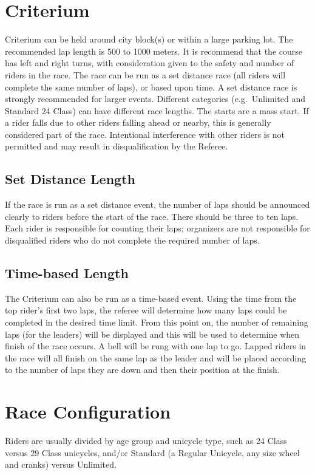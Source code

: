 \section{Criterium}
Criterium can be held around city block(s) or within a large parking lot.
The recommended lap length is 500 to 1000 meters.
It is recommend that the course has left and right turns, with consideration given to the safety and number of riders in the race.
The race can be run as a set distance race (all riders will complete the same number of laps), or based upon time.
A set distance race is strongly recommended for larger events.
Different categories (e.g.\ Unlimited and Standard 24 Class) can have different race lengths.
The starts are a mass start.
If a rider falls due to other riders falling ahead or nearby, this is generally considered part of the race.
Intentional interference with other riders is not permitted and may result in disqualification by the Referee.

\subsection{Set Distance Length}
If the race is run as a set distance event, the number of laps should be announced clearly to riders before the start of the race.
There should be three to ten laps.
Each rider is responsible for counting their laps; organizers are not responsible for disqualified riders who do not complete the required number of laps.

\subsection{Time-based Length}
The Criterium can also be run as a time-based event.
Using the time from the top rider’s first two laps, the referee will determine how many laps could be completed in the desired time limit.
From this point on, the number of remaining laps (for the leaders) will be displayed and this will be used to determine when finish of the race occurs.
A bell will be rung with one lap to go.
Lapped riders in the race will all finish on the same lap as the leader and will be placed according to the number of laps they are down and then their position at the finish.

\section{Race Configuration}

Riders are usually divided by age group and unicycle type, such as 24 Class versus 29 Class unicycles, and/or Standard (a Regular Unicycle, any size wheel and cranks) versus Unlimited.

